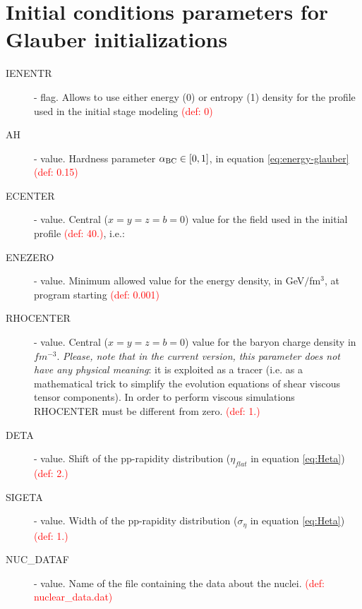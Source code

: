 \section{Initial conditions parameters for Glauber initializations}
\begin{description}
\item[IENENTR] \integer - flag. Allows to use either energy (0) or entropy (1) density for the profile used in the initial stage modeling \textcolor{red}{(def: 0)}
\item[AH] \real - value. Hardness parameter $\alpha_{\rm BC} \in [0,1]$, in equation \ref{eq:energy-glauber} \textcolor{red}{(def: 0.15)}
\item[ECENTER] \real - value. Central ($x=y=z=b=0$) value for the field used in the initial profile \textcolor{red}{(def: 40.)}, i.e.:
\item[ENEZERO] \real - value. Minimum allowed value for the energy density, in GeV$/$fm$^3$, at program starting \textcolor{red}{(def: 0.001)}
\item[RHOCENTER] \real - value.  Central ($x=y=z=b=0$) value for the baryon charge density in $fm^{-3}$. \emph{Please, note that in the current version, this parameter does not have any physical meaning}: it is  exploited as a tracer (i.e. as a mathematical trick to simplify the evolution equations of shear viscous tensor components). In order to perform viscous simulations RHOCENTER must be different from zero. \textcolor{red}{(def: 1.)}
\item[DETA] \real - value. Shift of the pp-rapidity distribution ($\eta_{flat}$ in equation \ref{eq:Heta}) \textcolor{red}{(def: 2.)}
\item[SIGETA]\real - value. Width of the pp-rapidity distribution  ($\sigma_\eta$ in equation \ref{eq:Heta}) \textcolor{red}{(def: 1.)}
\item[NUC\_DATAF]  \chara - value. Name of the file containing the data about the nuclei. \textcolor{red}{(def: nuclear\_data.dat)}
\end{description}
  
  
